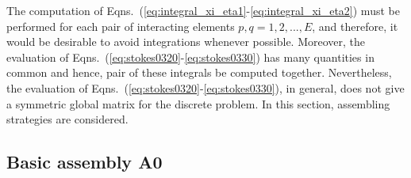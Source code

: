 \documentclass[oneside,onecolumn,10pt,final]{asme2ej}
\begin{document}
\noindent
The computation of %
Eqns.~(\ref{eq:integral_xi_eta1}-\ref{eq:integral_xi_eta2}) 
must be performed for each pair of interacting elements 
$p,q=1,2,...,E$, and therefore, it would be desirable 
to avoid integrations whenever possible.
%
Moreover, the evaluation of 
Eqns.~(\ref{eq:stokes0320}-\ref{eq:stokes0330}) 
has many quantities in common and hence,  pair
of these integrals  be computed together.
%
Nevertheless, the evaluation of %
Eqns.~(\ref{eq:stokes0320}-\ref{eq:stokes0330}),  
in general, does not give a symmetric global matrix for 
the discrete problem. %
%
In this section,  assembling strategies are 
considered. %


\subsection{Basic assembly A0}
\label{subsec:assembly-a0}
\end{document}
